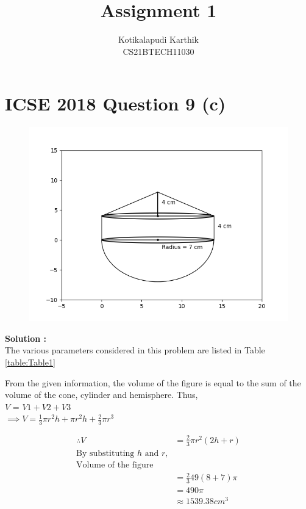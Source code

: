 \documentclass[journal,12pt,twocolumn]{IEEEtran}
\title{Assignment 1}
\author{Kotikalapudi Karthik \\
CS21BTECH11030}
\begin{document}
\maketitle

\section*{ICSE 2018 Question 9 (c)}
\begin{figure}[ht!]
	  \centering 
	  \includegraphics[width=\columnwidth]{Figs/question9c.png}
\end{figure}
\textbf{Solution :}\\
The various parameters considered in this problem are listed in Table
\eqref{table:Table1}
\begin{table}[ht!]
    \centering
    
    \caption{}
    \label{table:Table1}
\end{table}

From the given information, the volume of the figure is equal to the sum of the volume of the cone, cylinder and hemisphere. Thus,\\
$V$ = $V1 + V2 + V3$\\
$\implies V = \frac{1}{3} \pi r^2 h + \pi r^2 h + \frac{2}{3} \pi r^3$

\begin{align*}
    \therefore V&= \frac{2}{3} \pi r^2 (2h+r)\\
    \text{By substituting $h$ and $r$,}\\
    \text{Volume of the figure}\\
    &= \frac{2}{3} 49 (8+7) \pi\\
    &= 490 \pi\\ 
    &\approx 1539.38cm^3
\end{align*}
\end{document}
